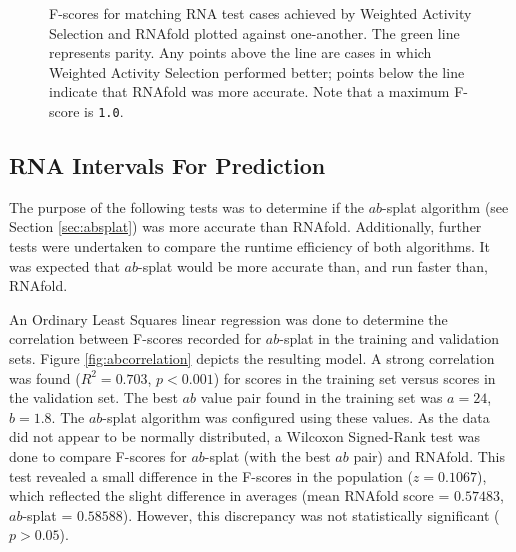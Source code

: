 \documentclass{cshonours}
\begin{document}
\begin{figure}
\begin{center}
\end{center}
\caption{F-scores for matching RNA test cases achieved by Weighted Activity Selection and RNAfold plotted against one-another. The green line represents parity. Any points above the line are cases in which Weighted Activity Selection performed better; points below the line indicate that RNAfold was more accurate. Note that a maximum F-score is \texttt{1.0}.}
\label{fig:wasrnafold}
\end{figure}


\subsection{RNA Intervals For Prediction}
\label{sec:res_absplat}
The purpose of the following tests was to determine if the $ab$-splat algorithm (see Section \ref{sec:absplat}) was more accurate than RNAfold. Additionally, further tests were undertaken to compare the runtime efficiency of both algorithms. It was expected that $ab$-splat would be more accurate than, and run faster than, RNAfold.

An Ordinary Least Squares linear regression was done to determine the correlation between F-scores recorded for $ab$-splat in the training and validation sets. Figure \ref{fig:abcorrelation} depicts the resulting model. A strong correlation was found ($R^2 = 0.703$, $p < 0.001$) for scores in the training set versus scores in the validation set. The best $ab$ value pair found in the training set was $a = 24$, $b = 1.8$. The $ab$-splat algorithm was configured using these values. As the data did not appear to be normally distributed, a Wilcoxon Signed-Rank test was done to compare F-scores for $ab$-splat (with the best $ab$ pair) and RNAfold. This test revealed a small difference in the F-scores in the population ($z = 0.1067$), which reflected the slight difference in averages (mean RNAfold score = $0.57483$, $ab$-splat = $0.58588$). However, this discrepancy was not statistically significant ($p > 0.05$).
\end{document}
